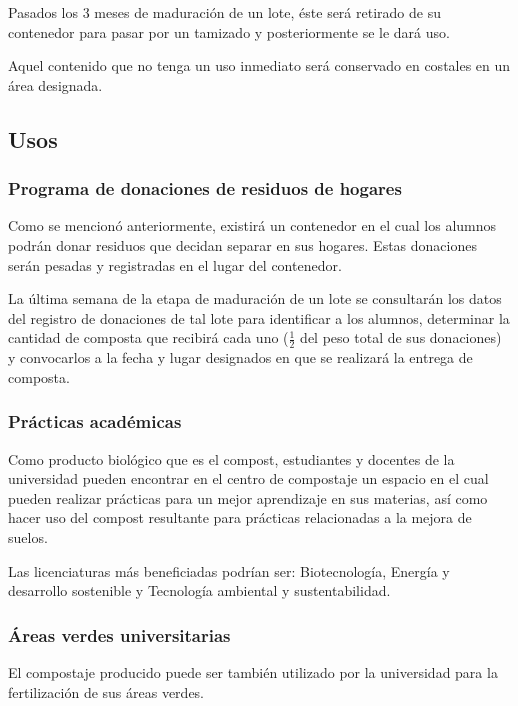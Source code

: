 Pasados los 3 meses de maduración de un lote, éste será retirado de su contenedor para pasar por un tamizado y posteriormente se le dará uso.

Aquel contenido que no tenga un uso inmediato será conservado en costales en un área designada.

\subsection{Usos}

\subsubsection{Programa de donaciones de residuos de hogares}

Como se mencionó anteriormente, existirá un contenedor en el cual los alumnos podrán donar residuos que decidan separar en sus hogares. Estas donaciones serán pesadas y registradas en el lugar del contenedor.

La última semana de la etapa de maduración de un lote se consultarán los datos del registro de donaciones de tal lote para identificar a los alumnos, determinar la cantidad de composta que recibirá cada uno ($\frac{1}{2}$ del peso total de sus donaciones) y convocarlos a la fecha y lugar designados en que se realizará la entrega de composta.

\subsubsection{Prácticas académicas}

Como producto biológico que es el compost, estudiantes y docentes de la universidad pueden encontrar en el centro de compostaje un espacio en el cual pueden realizar prácticas para un mejor aprendizaje en sus materias, así como hacer uso del compost resultante para prácticas relacionadas a la mejora de suelos.

Las licenciaturas más beneficiadas podrían ser: Biotecnología, Energía y desarrollo sostenible y Tecnología ambiental y sustentabilidad.

\subsubsection{Áreas verdes universitarias}

El compostaje producido puede ser también utilizado por la universidad para la fertilización de sus áreas verdes.

